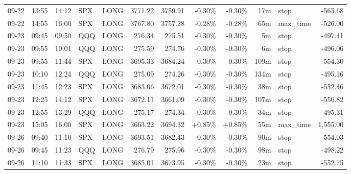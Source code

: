 \documentclass[11pt,a4paper,twoside]{article}
\begin{document}
\begin{center}
\begin{longtable}{>{\color{txtmain}}l l l l l r r r r r >{\color{txtmain}}l r}
09-22 & 13:55 & 14:12 & SPX & LONG & 3771.22 & 3759.91 & \textcolor{lossred}{-0.30\%} & \textcolor{lossred}{-0.30\%} & 17m & stop & \textcolor{lossred}{-565.68} \\
09-22 & 14:55 & 16:00 & SPX & LONG & 3767.80 & 3757.28 & \textcolor{lossred}{-0.28\%} & \textcolor{lossred}{-0.28\%} & 65m & max\_time & \textcolor{lossred}{-526.00} \\
09-23 & 09:45 & 09:50 & QQQ & LONG & 276.34 & 275.51 & \textcolor{lossred}{-0.30\%} & \textcolor{lossred}{-0.30\%} & 5m & stop & \textcolor{lossred}{-497.41} \\
09-23 & 09:55 & 10:01 & QQQ & LONG & 275.59 & 274.76 & \textcolor{lossred}{-0.30\%} & \textcolor{lossred}{-0.30\%} & 6m & stop & \textcolor{lossred}{-496.06} \\
09-23 & 09:55 & 11:44 & SPX & LONG & 3695.33 & 3684.24 & \textcolor{lossred}{-0.30\%} & \textcolor{lossred}{-0.30\%} & 109m & stop & \textcolor{lossred}{-554.30} \\
09-23 & 10:10 & 12:24 & QQQ & LONG & 275.09 & 274.26 & \textcolor{lossred}{-0.30\%} & \textcolor{lossred}{-0.30\%} & 134m & stop & \textcolor{lossred}{-495.16} \\
09-23 & 11:45 & 12:23 & SPX & LONG & 3683.06 & 3672.01 & \textcolor{lossred}{-0.30\%} & \textcolor{lossred}{-0.30\%} & 38m & stop & \textcolor{lossred}{-552.46} \\
09-23 & 12:25 & 14:12 & SPX & LONG & 3672.11 & 3661.09 & \textcolor{lossred}{-0.30\%} & \textcolor{lossred}{-0.30\%} & 107m & stop & \textcolor{lossred}{-550.82} \\
09-23 & 12:55 & 13:29 & QQQ & LONG & 275.17 & 274.34 & \textcolor{lossred}{-0.30\%} & \textcolor{lossred}{-0.30\%} & 34m & stop & \textcolor{lossred}{-495.31} \\
09-23 & 15:05 & 16:00 & SPX & LONG & 3663.22 & 3694.32 & \textcolor{wingreen}{+0.85\%} & \textcolor{wingreen}{+0.85\%} & 55m & max\_time & \textcolor{wingreen}{1,555.00} \\
09-26 & 09:40 & 11:10 & SPX & LONG & 3693.51 & 3682.43 & \textcolor{lossred}{-0.30\%} & \textcolor{lossred}{-0.30\%} & 90m & stop & \textcolor{lossred}{-554.03} \\
09-26 & 09:45 & 11:23 & QQQ & LONG & 276.79 & 275.96 & \textcolor{lossred}{-0.30\%} & \textcolor{lossred}{-0.30\%} & 98m & stop & \textcolor{lossred}{-498.22} \\
09-26 & 11:10 & 11:33 & SPX & LONG & 3685.01 & 3673.95 & \textcolor{lossred}{-0.30\%} & \textcolor{lossred}{-0.30\%} & 23m & stop & \textcolor{lossred}{-552.75} \\

\end{longtable}
\end{center}
\end{document}
